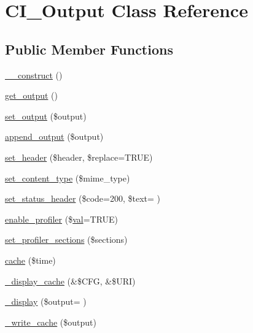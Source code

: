 \hypertarget{class_c_i___output}{}\section{C\+I\+\_\+\+Output Class Reference}
\label{class_c_i___output}
\subsection*{Public Member Functions}
\begin{DoxyCompactItemize}
\item 
\hyperlink{class_c_i___output_a095c5d389db211932136b53f25f39685}{\+\_\+\+\_\+construct} ()
\item 
\hyperlink{class_c_i___output_aa6c3f8688f804de4f1af8a462fffb922}{get\+\_\+output} ()
\item 
\hyperlink{class_c_i___output_afcff30d791a8006216f5c2fe93a95983}{set\+\_\+output} (\$output)
\item 
\hyperlink{class_c_i___output_a7c79b8239d6ecbba0c8fdd00bb619651}{append\+\_\+output} (\$output)
\item 
\hyperlink{class_c_i___output_a270389a1636faa81eda5ef3fa900ea25}{set\+\_\+header} (\$header, \$replace=T\+R\+UE)
\item 
\hyperlink{class_c_i___output_a7ab03763a8ef83963392436dc416be86}{set\+\_\+content\+\_\+type} (\$mime\+\_\+type)
\item 
\hyperlink{class_c_i___output_ae5416517aea15ac6c9136ce83002002f}{set\+\_\+status\+\_\+header} (\$code=200, \$text= \textquotesingle{}\textquotesingle{})
\item 
\hyperlink{class_c_i___output_a7bd693db25952e1b074630f52ee67500}{enable\+\_\+profiler} (\$\hyperlink{jquery_8tokeninput_8js_a21200c34618b8c12c446cd51529ebd8c}{val}=T\+R\+UE)
\item 
\hyperlink{class_c_i___output_ac5e50de443748cf3d356d29eba2caaaf}{set\+\_\+profiler\+\_\+sections} (\$sections)
\item 
\hyperlink{class_c_i___output_a6eae3cd828cf30926d44f1ab6011f939}{cache} (\$time)
\item 
\hyperlink{class_c_i___output_acce78bdac02df9ab196a9c5939f6c4ab}{\+\_\+display\+\_\+cache} (\&\$C\+FG, \&\$U\+RI)
\item 
\hyperlink{class_c_i___output_a16a22fa40f70c2b611fa9dd7e2a63ef1}{\+\_\+display} (\$output= \textquotesingle{}\textquotesingle{})
\item 
\hyperlink{class_c_i___output_a772aa9eb3f60f66fa194443ca0bdd8a4}{\+\_\+write\+\_\+cache} (\$output)
\end{DoxyCompactItemize}
